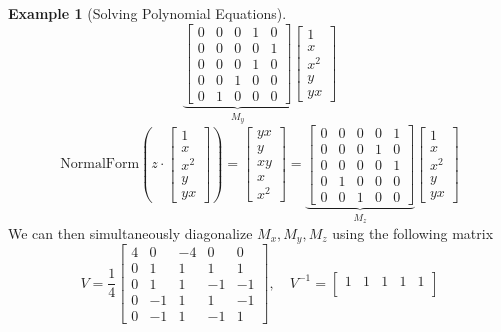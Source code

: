 \documentclass[
]{book}
\theoremstyle{definition}
\theoremstyle{definition}
\newtheorem{example}{Example}[chapter]
\theoremstyle{definition}
\theoremstyle{definition}
\theoremstyle{remark}
\begin{document}
\begin{example}[Solving Polynomial Equations]
\[\underbrace{\begin{bmatrix}
0 & 0 & 0 & 1 & 0 \\
0 & 0 & 0 & 0 & 1 \\
0 & 0 & 0 & 1 & 0 \\
0 & 0 & 1 & 0 & 0 \\
0 & 1 & 0 & 0 & 0 
\end{bmatrix}}_{M_y}
\begin{bmatrix}
1 \\
x \\
x^2 \\
y \\
yx 
\end{bmatrix}
\]
\[
\mathrm{NormalForm}\left(
z \cdot \begin{bmatrix}
1 \\
x \\
x^2 \\
y \\
yx 
\end{bmatrix}
\right) = 
\begin{bmatrix}
yx \\
y \\
xy \\
x \\
x^2 \end{bmatrix} = 
\underbrace{\begin{bmatrix}
0 & 0 & 0 & 0 & 1 \\
0 & 0 & 0 & 1 & 0 \\
0 & 0 & 0 & 0 & 1 \\
0 & 1 & 0 & 0 & 0 \\
0 & 0 & 1 & 0 & 0 
\end{bmatrix}}_{M_z}
\begin{bmatrix}
1 \\
x \\
x^2 \\
y \\
yx 
\end{bmatrix}
\]
We can then simultaneously diagonalize \(M_x,M_y,M_z\) using the following matrix
\[
V = \frac{1}{4}\begin{bmatrix}
4 & 0 & -4 & 0 & 0 \\
0 & 1 & 1 & 1 & 1\\
0 & 1 & 1 & -1 & -1 \\
0 & -1 & 1 & 1 & -1 \\
0 & -1 & 1 & -1 & 1
\end{bmatrix}, \quad 
V^{-1}= \begin{bmatrix}
1 & 1 & 1 & 1 & 1\\

\end{bmatrix}\]
\end{example}
\end{document}
